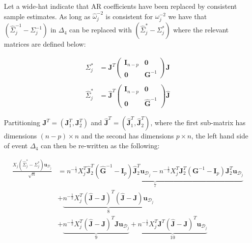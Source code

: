 \documentclass[11pt]{report}\usepackage[utf8]{inputenc}
\begin{document}
Let a wide-hat indicate that AR coefficients have been replaced by consistent sample estimates. As long as $\widehat{\omega}_j^{-2}$ is consistent for $\omega_j^{-2}$ we have that $\left ( \widehat{\Sigma}_j^{-1}-\Sigma_j^{-1} \right )$ in $\Delta_4$ can be replaced with $\left ( \widehat{\Sigma}_j^*-\Sigma_j^* \right )$ where the relevant matrices are defined below: 

\begin{align*}
    \Sigma_j^* & = \boldsymbol{J}^T \begin{pmatrix}
    \boldsymbol{I}_{n-p} & \boldsymbol{0} \\ 
    \boldsymbol{0} & \boldsymbol{G}^{-1}
    \end{pmatrix} \boldsymbol{J} \\
    & \\
    \widehat{\Sigma}_j^* & = \widehat{\boldsymbol{J}}^T \begin{pmatrix}
    \boldsymbol{I}_{n-p} & \boldsymbol{0} \\ 
    \boldsymbol{0} & \widehat{\boldsymbol{G}}^{-1}
    \end{pmatrix} \widehat{\boldsymbol{J}}
\end{align*}

Partitioning $\boldsymbol{J}^T = \left ( \boldsymbol{J}_1^T, \boldsymbol{J}_2^T \right )$ and $\widehat{\boldsymbol{J}}^T = \left ( \widehat{\boldsymbol{J}}_1^T, \widehat{\boldsymbol{J}}_2^T \right )$, where the first sub-matrix has dimensions $(n-p) \times n$ and the second has dimensions $p \times n$, the left hand side of event $\Delta_4$ can then be re-written as the following: 

\begin{align*}
    \frac{X_j\left ( \widehat{\Sigma}_j^* - \Sigma_j^* \right ) \boldsymbol{u}_{\mathcal{D}_j}}{\sqrt{n}} & = \underbrace{n^{-\frac{1}{2}}X_j^T \widehat{\boldsymbol{J}}_2^T \left ( \widehat{\boldsymbol{G}}^{-1}-\boldsymbol{I}_p \right )\widehat{\boldsymbol{J}}^T_2 \boldsymbol{u}_{\mathcal{D}_j} - n^{-\frac{1}{2}}X_j^T \boldsymbol{J}_2^T \left ( \boldsymbol{G}^{-1}-\boldsymbol{I}_p \right )\boldsymbol{J}^T_2 \boldsymbol{u}_{\mathcal{D}_j}}_7 \\
    & + \underbrace{n^{-\frac{1}{2}}X_j^T\left ( \widehat{\boldsymbol{J}} - \boldsymbol{J} \right )^T\left ( \widehat{\boldsymbol{J}} - \boldsymbol{J} \right ) \boldsymbol{u}_{\mathcal{D}_j}}_{8} \\
    & + \underbrace{n^{-\frac{1}{2}}X_j^T\left ( \widehat{\boldsymbol{J}} - \boldsymbol{J} \right )^T\boldsymbol{J} \boldsymbol{u}_{\mathcal{D}_j}}_9 + \underbrace{n^{-\frac{1}{2}}X_j^T \boldsymbol{J}^T\left ( \widehat{\boldsymbol{J}} - \boldsymbol{J} \right )^T \boldsymbol{u}_{\mathcal{D}_j}}_{10}
\end{align*}
\end{document}
